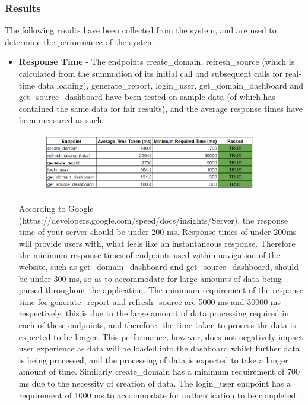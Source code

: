 \documentclass[12pt]{article}
\begin{document}
\subsubsection{Results}
The following results have been collected from the system, and are used to determine the performance of the system:
\begin{itemize}
    \item \textbf{Response Time} - The endpoints create\_domain, refresh\_source (which is calculated from the summation of its initial call and subsequent calls for real-time data loading), generate\_report, login\_user, get\_domain\_dashboard and get\_source\_dashboard have been tested on sample data (of which has contained the same data for fair results), and the average response times have been measured as such:
          \begin{figure}[H]
              \centering
              \includegraphics[width=0.9\textwidth]{PerfTable.png}
          \end{figure}
          According to Google (https://developers.google.com/speed/docs/insights/Server), the response time of your server should be under 200 ms. Response times of under 200ms will provide users with, what feels like an instantaneous response. Therefore the minimum response times of endpoints used within navigation of the website, such as get\_domain\_dashboard and get\_source\_dashboard, should be under 300 ms, so as to accommodate for large amounts of data being parsed throughout the application.
          The minimum requirement of the response time for generate\_report and refresh\_source are 5000 ms and 30000 ms respectively, this is due to the large amount of data processing required in each of these endpoints, and therefore, the time taken to process the data is expected to be longer. This performance, however, does not negatively impact user experience as data will be loaded into the dashboard whilst further data is being processed, and the processing of data is expected to take a longer amount of time.
          Similarly create\_domain has a minimum requirement of 700 ms due to the necessity of creation of data. The login\_user endpoint has a requirement of 1000 ms to accommodate for authentication to be completed.

\end{itemize}
\end{document}

